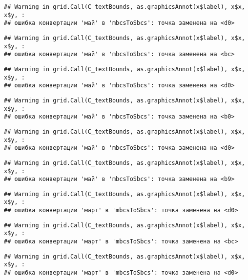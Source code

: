 \documentclass[
]{article}
\begin{document}
\begin{verbatim}
## Warning in grid.Call(C_textBounds, as.graphicsAnnot(x$label), x$x, x$y, :
## ошибка конвертации 'май' в 'mbcsToSbcs': точка заменена на <d0>
\end{verbatim}

\begin{verbatim}
## Warning in grid.Call(C_textBounds, as.graphicsAnnot(x$label), x$x, x$y, :
## ошибка конвертации 'май' в 'mbcsToSbcs': точка заменена на <bc>
\end{verbatim}

\begin{verbatim}
## Warning in grid.Call(C_textBounds, as.graphicsAnnot(x$label), x$x, x$y, :
## ошибка конвертации 'май' в 'mbcsToSbcs': точка заменена на <d0>
\end{verbatim}

\begin{verbatim}
## Warning in grid.Call(C_textBounds, as.graphicsAnnot(x$label), x$x, x$y, :
## ошибка конвертации 'май' в 'mbcsToSbcs': точка заменена на <b0>
\end{verbatim}

\begin{verbatim}
## Warning in grid.Call(C_textBounds, as.graphicsAnnot(x$label), x$x, x$y, :
## ошибка конвертации 'май' в 'mbcsToSbcs': точка заменена на <d0>
\end{verbatim}

\begin{verbatim}
## Warning in grid.Call(C_textBounds, as.graphicsAnnot(x$label), x$x, x$y, :
## ошибка конвертации 'май' в 'mbcsToSbcs': точка заменена на <b9>
\end{verbatim}

\begin{verbatim}
## Warning in grid.Call(C_textBounds, as.graphicsAnnot(x$label), x$x, x$y, :
## ошибка конвертации 'март' в 'mbcsToSbcs': точка заменена на <d0>
\end{verbatim}

\begin{verbatim}
## Warning in grid.Call(C_textBounds, as.graphicsAnnot(x$label), x$x, x$y, :
## ошибка конвертации 'март' в 'mbcsToSbcs': точка заменена на <bc>
\end{verbatim}

\begin{verbatim}
## Warning in grid.Call(C_textBounds, as.graphicsAnnot(x$label), x$x, x$y, :
## ошибка конвертации 'март' в 'mbcsToSbcs': точка заменена на <d0>
\end{verbatim}
\end{document}
